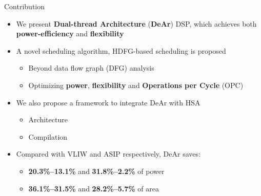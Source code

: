 \documentclass[handout]{beamer}
\begin{document}
\begin{CJK}{UTF8}{bkai}
    \begin{frame}{Contribution}
        \begin{itemize}
            \item <2->{
                    We present \textbf{Dual-thread Architecture} (\textbf{DeAr}) DSP, which achieves both \textbf{power-efficiency} and \textbf{flexibility}
                }
            \item <3->{
                    A novel scheduling algorithm, HDFG-based scheduling is proposed
                    \begin{itemize}
                        \item Beyond data flow graph (DFG) analysis
                        \item Optimizing \textbf{power}, \textbf{flexibility} and \textbf{Operations per Cycle} (OPC)
                    \end{itemize}
                }
            \item <4->{
                    We also propose a framework to integrate DeAr with HSA
                    \begin{itemize}
                        \item {
                                Architecture
                            }
                        \item {
                                Compilation
                            }
                    \end{itemize}
                }
            \item <5->{
                    Compared with VLIW and ASIP respectively, DeAr saves: 
                    \begin{itemize}
                        \item {
                                \textbf{20.3\%--13.1\%} and \textbf{31.8\%--2.2\%} of power
                                }
                            \item {
                                    \textbf{36.1\%--31.5\%} and \textbf{28.2\%--5.7\%} of area
                                    }
                            \end{itemize}
                        }
                \end{itemize}
            \end{frame}


\end{CJK}
\end{document}

